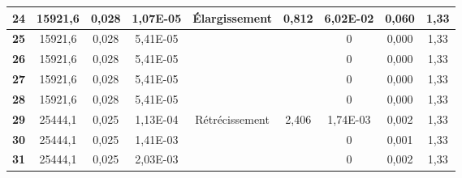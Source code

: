 \documentclass[12pt, a4paper, twoside]{article} %
\begin{document}
\begin{landscape}
\begin{table}[htbp]
\begin{tabular}{|c|c|c|c|c|c|c|c|c|}
\hline
\textbf{24} & 15921,6 & 0,028  & 1,07E-05 & \cellcolor[rgb]{ .576,  .769,  .49} \'Elargissement & 0,812  & 6,02E-02 & 0,060  & 1,33 \\
\hline
\textbf{25} & 15921,6 & 0,028  & 5,41E-05 & \cellcolor[rgb]{ .576,  .769,  .49} &        & 0 & 0,000  & 1,33 \\
\hline
\textbf{26} & 15921,6 & 0,028  & 5,41E-05 & \cellcolor[rgb]{ .576,  .769,  .49} &        & 0 & 0,000  & 1,33 \\
\hline
\textbf{27} & 15921,6 & 0,028  & 5,41E-05 & \cellcolor[rgb]{ .576,  .769,  .49} &        & 0 & 0,000  & 1,33 \\
\hline
\textbf{28} & 15921,6 & 0,028  & 5,41E-05 & \cellcolor[rgb]{ .576,  .769,  .49} &        & 0 & 0,000  & 1,33 \\
\hline
\textbf{29} & 25444,1 & 0,025  & 1,13E-04 & \cellcolor[rgb]{ .576,  .769,  .49} Rétrécissement & 2,406  & 1,74E-03 & 0,002  & 1,33 \\
\hline
\textbf{30} & 25444,1 & 0,025  & 1,41E-03 & \cellcolor[rgb]{ .576,  .769,  .49} &        & 0 & 0,001  & 1,33 \\
\hline  
\textbf{31} & 25444,1 & 0,025  & 2,03E-03 & \cellcolor[rgb]{ .576,  .769,  .49} &        & 0 & 0,002  & 1,33 \\
\hline
\end{tabular}%
  \label{tab:Valeurs_theo_III}%
\end{table}
\end{landscape}



%
%
%
%
%
%
\end{document}
